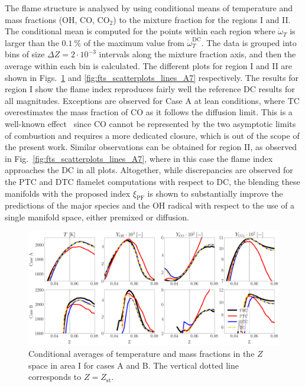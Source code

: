 \documentclass[preprint,12pt,authoryear]{elsarticle}
\begin{document}
{The flame structure is analysed by using conditional means of temperature and mass fractions (OH, CO, CO$_2$) to the mixture fraction 
for the regions I and II. The conditional mean is computed for the points within each region where $\dot{\omega}_T$ is larger than the $0.1~\%$ of the maximum value from $\dot{\omega}_{T}^\mathrm{DC}$. The data is grouped into bins of size $\Delta Z = 2 \cdot 10^{-3}$ intervals along the mixture fraction axis, and then the average within each bin is calculated. The different plots for region I and II are shown in Figs.~\ref{fig:fts_scatterplots_lines_A2} and \ref{fig:fts_scatterplots_lines_A7} respectively. 
The results for region I show the flame index 
reproduces fairly well the reference DC results for all magnitudes. Exceptions are observed for Case A at lean conditions, where TC overestimates the mass fraction of CO as it follows the diffusion limit. This is a well-known effect~\cite{illana_extended_2021,fiorina_approximating_2005,zirwes_identification_2021} since CO cannot be represented by the
two asymptotic limits of combustion and requires a more dedicated closure, which is out of the scope of the present work. 
Similar observations can be obtained for region II, as observed in Fig.~\ref{fig:fts_scatterplots_lines_A7}, where in this case the flame index approaches the DC in all plots. Altogether, while discrepancies are observed for the PTC and DTC flamelet computations with respect to DC, the blending these manifolds with the proposed index $\xi_\mathrm{PF}$ is shown to substantially improve the predictions of the major species and the OH radical with respect to the use of a single manifold space, either premixed or diffusion.


\begin{figure}[h!]
	\includegraphics[scale=0.18]{./figures/fts_scatterplots_lines_A2}
	\caption{Conditional averages of temperature and mass fractions in the $Z$ space in area I for cases A and B. The vertical dotted line corresponds to $Z = Z_\mathrm{st}$.}
	\label{fig:fts_scatterplots_lines_A2}
\end{figure}


}
\end{document}
